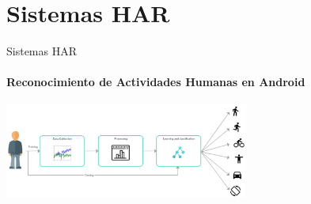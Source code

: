 
\section{Sistemas HAR}
\begin{frame}{Sistemas HAR}

\framesubtitle{Reconocimiento de Actividades Humanas en Android}
\begin{center}
\includegraphics[width=8cm]{../capitulo-2/graphics/harsystem2}
\par\end{center}
\end{frame}


